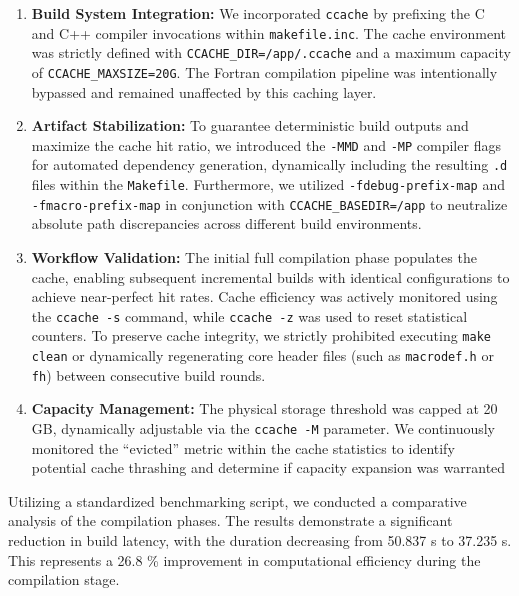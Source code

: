 \begin{enumerate}
    \item \textbf{Build System Integration:} We incorporated \texttt{ccache} by prefixing the C and C++ compiler invocations within \texttt{makefile.inc}. The cache environment was strictly defined with \texttt{CCACHE\_DIR=/app/.ccache} and a maximum capacity of \texttt{CCACHE\_MAXSIZE=20G}. 
    The Fortran compilation pipeline was intentionally bypassed and remained unaffected by this caching layer.
    
    \item \textbf{Artifact Stabilization:} To guarantee deterministic build outputs and maximize the cache hit ratio, we introduced the \texttt{-MMD} and \texttt{-MP} compiler flags for automated dependency generation, dynamically including the resulting \texttt{.d} files within the \texttt{Makefile}. Furthermore, we utilized \texttt{-fdebug-prefix-map} and \texttt{-fmacro-prefix-map} in conjunction with \texttt{CCACHE\_BASEDIR=/app} to neutralize absolute path discrepancies across different build environments.
    
    \item \textbf{Workflow Validation:} The initial full compilation phase populates the cache, enabling subsequent incremental builds with identical configurations to achieve near-perfect hit rates. 
    Cache efficiency was actively monitored using the \texttt{ccache -s} command, while \texttt{ccache -z} was used to reset statistical counters. 
    To preserve cache integrity, we strictly prohibited executing \texttt{make clean} or dynamically regenerating core header files (such as \texttt{macrodef.h} or \texttt{fh}) between consecutive build rounds.
    
    \item \textbf{Capacity Management:} The physical storage threshold was capped at 20 GB, dynamically adjustable via the \texttt{ccache -M} parameter. 
    We continuously monitored the ``evicted'' metric within the cache statistics to identify potential cache thrashing and determine if capacity expansion was warranted
\end{enumerate}
Utilizing a standardized benchmarking script, we conducted a comparative analysis of the compilation phases. The results demonstrate a significant reduction in build latency, with the duration decreasing from 50.837 s to 37.235 s. This represents a 26.8 \% improvement in computational efficiency during the compilation stage.

